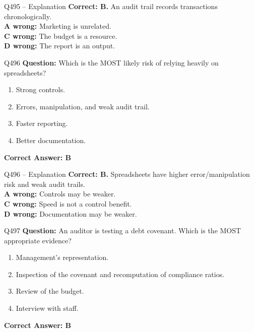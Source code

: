 \documentclass[aspectratio=169,10pt]{beamer}
\begin{document}
	\begin{frame}[t]{Q495 -- Explanation}
		\small
		\textbf{Correct: B.} An audit trail records transactions chronologically. \\[4pt]
		\textbf{A wrong:} Marketing is unrelated. \\[2pt]
		\textbf{C wrong:} The budget is a resource. \\[2pt]
		\textbf{D wrong:} The report is an output.
	\end{frame}
	
	\begin{frame}[t]{Q496}
		\small
		\textbf{Question:} Which is the MOST likely risk of relying heavily on spreadsheets?
		\begin{enumerate}[label=\Alph*.,itemsep=1pt,topsep=2pt]
			\item Strong controls.
			\item Errors, manipulation, and weak audit trail.
			\item Faster reporting.
			\item Better documentation.
		\end{enumerate}
		\vspace{4pt}
		\textbf{Correct Answer: B}
	\end{frame}
	
	\begin{frame}[t]{Q496 -- Explanation}
		\small
		\textbf{Correct: B.} Spreadsheets have higher error/manipulation risk and weak audit trails. \\[4pt]
		\textbf{A wrong:} Controls may be weaker. \\[2pt]
		\textbf{C wrong:} Speed is not a control benefit. \\[2pt]
		\textbf{D wrong:} Documentation may be weaker.
	\end{frame}
	
	\begin{frame}[t]{Q497}
		\small
		\textbf{Question:} An auditor is testing a debt covenant. Which is the MOST appropriate evidence?
		\begin{enumerate}[label=\Alph*.,itemsep=1pt,topsep=2pt]
			\item Management's representation.
			\item Inspection of the covenant and recomputation of compliance ratios.
			\item Review of the budget.
			\item Interview with staff.
		\end{enumerate}
		\vspace{4pt}
		\textbf{Correct Answer: B}
	\end{frame}
	
\end{document}
